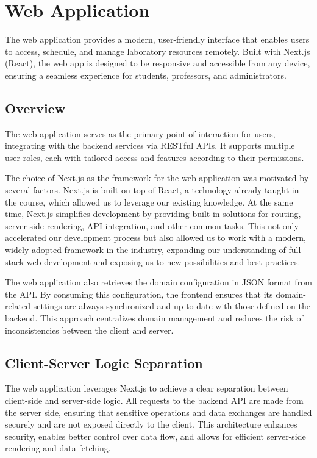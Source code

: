 \section{Web Application}

The web application provides a modern, user-friendly interface that enables users to access, schedule, and manage laboratory resources remotely. Built with Next.js (React), the web app is designed to be responsive and accessible from any device, ensuring a seamless experience for students, professors, and administrators.

\subsection{Overview}
The web application serves as the primary point of interaction for users, integrating with the backend services via RESTful APIs. It supports multiple user roles, each with tailored access and features according to their permissions.

The choice of Next.js as the framework for the web application was motivated by several factors. Next.js is built on top of React, a technology already taught in the course, which allowed us to leverage our existing knowledge. At the same time, Next.js simplifies development by providing built-in solutions for routing, server-side rendering, API integration, and other common tasks. This not only accelerated our development process but also allowed us to work with a modern, widely adopted framework in the industry, expanding our understanding of full-stack web development and exposing us to new possibilities and best practices.

The web application also retrieves the domain configuration in JSON format from the API. By consuming this configuration, the frontend ensures that its domain-related settings are always synchronized and up to date with those defined on the backend. This approach centralizes domain management and reduces the risk of inconsistencies between the client and server.

\subsection{Client-Server Logic Separation}

The web application leverages Next.js to achieve a clear separation between client-side and server-side logic. All requests to the backend API are made from the server side, ensuring that sensitive operations and data exchanges are handled securely and are not exposed directly to the client. This architecture enhances security, enables better control over data flow, and allows for efficient server-side rendering and data fetching.

